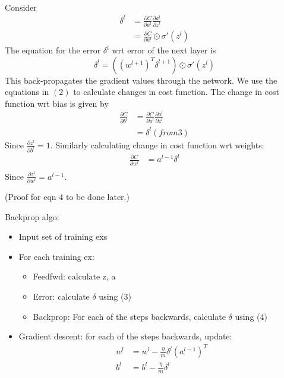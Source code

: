 \documentclass[11pt]{article}
\begin{document}
Consider
\begin{equation}
\begin{split}
    \delta^{l} & = \frac{\partial C}{\partial a^{l}}\frac{\partial a^{l}}{\partial z^{l}} \\
    & = \frac{\partial C}{\partial a^{l}}\odot \sigma'(z^{l})
\end{split}
\end{equation}
The equation for the error $ \delta^{l} $ wrt error of the next layer is
\begin{equation}
    \delta^{l} = ((w^{l+1})^T\delta^{l+1})\odot \sigma'(z^{l})
\end{equation}
This back-propagates the gradient values through the network.
We use the equations in $ (2) $ to calculate changes in cost function. The 
change in cost function wrt bias is given by 
\begin{equation}
\begin{split}
    \frac{\partial C}{\partial b^{l}} & = \frac{\partial C}{\partial a^{l}}\frac{\partial a^{l}}{\partial z^{l}} \\
    & = \delta^{l} (from 3)
\end{split}
\end{equation}
Since $ \frac{\partial z^{l}}{\partial b^{l}} = 1 $. Similarly calculating change in cost function wrt
weights:
\begin{equation}
\begin{split}
    \frac{\partial C}{\partial w^{l}} & = a^{l-1}\delta^l \\
\end{split}
\end{equation}
Since $ \frac{\partial z^{l}}{\partial w^{l}} = a^{l-1} $. 

(Proof for eqn 4 to be done later.)

Backprop algo:
\begin{itemize}
  \item Input set of training exs
  \item For each training ex:
  \begin{itemize}
    \item  Feedfwd: calculate z, a
    \item Error: calculate $ \delta $ using (3)
    \item Backprop: For each of the steps backwards, calculate $ \delta $ using (4)
  \end{itemize}
  \item Gradient descent: for each of the steps backwards, update:
  \begin{equation*}
  \begin{split}
  w^l & = w^l - \frac{\eta}{m} \delta^l(a^{l-1})^T \\
  b^l & = b^l - \frac{\eta}{m} \delta^l
  \end{split}
  \end{equation*}
\end{itemize}
\end{document}
